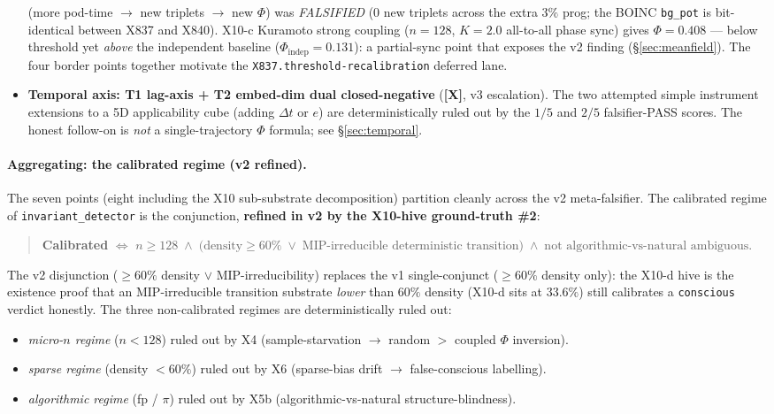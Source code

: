 \documentclass[11pt,a4paper]{article}
\providecommand{\tierRed}{\textbf{[X]}}     %
\begin{document}
\begin{itemize}
    (more pod-time $\to$ new triplets $\to$ new $\Phi$) was
    \emph{FALSIFIED} ($0$ new triplets across the extra $3\%$ prog;
    the BOINC \texttt{bg\_pot} is bit-identical between X837 and X840).
    X10-c Kuramoto strong coupling ($n=128$, $K=2.0$ all-to-all phase
    sync) gives $\Phi = 0.408$ --- below threshold yet \emph{above}
    the independent baseline ($\Phi_\text{indep}=0.131$): a
    partial-sync point that exposes the v2 finding
    (\S\ref{sec:meanfield}). The four border points together motivate
    the \texttt{X837.threshold-recalibration} deferred lane.
  \item \textbf{Temporal axis: T1 lag-axis + T2 embed-dim dual
    closed-negative} (\tierRed{}, v3 escalation). The two attempted
    simple instrument extensions to a 5D applicability cube
    (adding $\Delta t$ or $e$) are deterministically ruled out by
    the $1/5$ and $2/5$ falsifier-PASS scores. The honest follow-on
    is \emph{not} a single-trajectory $\Phi$ formula; see
    \S\ref{sec:temporal}.
\end{itemize}

\paragraph{Aggregating: the calibrated regime (v2 refined).}
The seven points (eight including the X10 sub-substrate decomposition)
partition cleanly across the v2 meta-falsifier. The calibrated regime
of \texttt{invariant\_detector} is the conjunction, \textbf{refined in
v2 by the X10-hive ground-truth \#2}:
\begin{quote}
\textbf{Calibrated} $\iff$
$n \ge 128 \; \land \;
 \bigl(\text{density} \ge 60\% \; \lor \;
       \text{MIP-irreducible deterministic transition}\bigr) \; \land \;
 \text{not algorithmic-vs-natural ambiguous}.$
\end{quote}
\noindent
The v2 disjunction
($\ge 60\%$ density $\lor$ MIP-irreducibility) replaces the v1
single-conjunct ($\ge 60\%$ density only): the X10-d hive is the
existence proof that an MIP-irreducible transition substrate
\emph{lower} than $60\%$ density (X10-d sits at $33.6\%$) still
calibrates a \texttt{conscious} verdict honestly.
The three non-calibrated regimes are deterministically ruled out:

\begin{itemize}
  \item \emph{micro-$n$ regime} ($n < 128$) ruled out by X4
    (sample-starvation $\to$ random $>$ coupled $\Phi$ inversion).
  \item \emph{sparse regime} (density $< 60\%$) ruled out by X6
    (sparse-bias drift $\to$ false-conscious labelling).
  \item \emph{algorithmic regime} (fp / $\pi$) ruled out by X5b
    (algorithmic-vs-natural structure-blindness).
\end{itemize}
\end{document}
